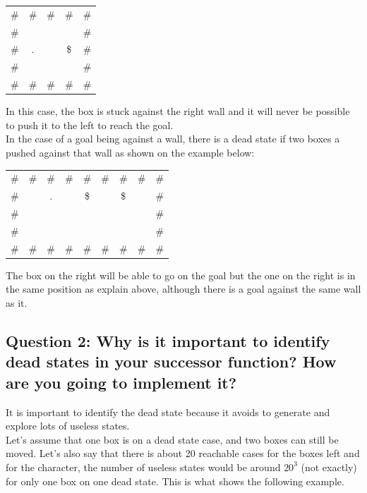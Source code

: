 \documentclass[a4paper,10pt]{article}
\begin{document}
	\begin{center}
	\begin{tabular}{ccccc}
		\# & \# & \# & \# & \# \\ 
		\# &    &    &    & \# \\ 
		\# & .  &    & \$ & \# \\ 
		\# &    &    &    & \# \\ 
		\# & \# & \# & \# & \# \\ 
	\end{tabular}
	\end{center}
	
	In this case, the box is stuck against the right wall and it will never be possible to push it to the left to reach the goal.\\
	In the case of a goal being against a wall, there is a dead state if two boxes a pushed against that wall as shown on the example below: \\
	
	\begin{center}
	\begin{tabular}{ccccccccc}
		\# & \# & \# & \# & \# & \# & \# & \# & \# \\ 
		\# &    & .  &    & \$ &    & \$ &    & \# \\ 
		\# &    &    &    &    &    &    &    & \# \\ 
		\# &    &    &    &    &    &    &    & \# \\ 
		\# & \# & \# & \# & \# & \# & \# & \# & \# \\ 
	\end{tabular}
	\end{center}
	The box on the right will be able to go on the goal but the one on the right is in the same position as explain above, although there is a goal against the same wall as it.
		
		\subsection{Question 2: Why is it important to identify dead states in your successor function? How are you going to implement it?}
			
			It is important to identify the dead state because it avoids to generate and explore lots of useless states.\\
			 Let's assume that one box is on a dead state case, and two boxes can still be moved. Let's also say that there is about 20 reachable cases for the boxes left and for the character, the number of useless states would be around $ 20^{3} $ (not exactly) for only one box on one dead state. This is what shows the following example.\\
\end{document}
